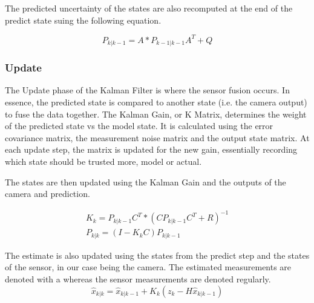 \documentclass[bare_jrnl_transmag]{subfiles}
\begin{document}
The predicted uncertainty of the states are also recomputed at the end of the predict state suing the following equation.

\begin{equation*}
    P_{k|k-1} = A * P_{k-1|k-1} A^T + Q
\end{equation*}


    
\subsubsection{Update}
The Update phase of the Kalman Filter is where the sensor fusion occurs. In essence, the predicted state is compared to another state (i.e. the camera output) to fuse the data together. 
The Kalman Gain, or K Matrix, determines the weight of the predicted state vs the model state. It is calculated using the error covariance matrix, the measurement noise matrix and the output state matrix. 
At each update step, the matrix is updated for the new gain, essentially recording which state should be trusted more, model or actual.

The states are then updated using the Kalman Gain and the outputs of the camera and prediction.

\begin{eqnarray*}
    K_k = P_{k|k-1} C^T * (C P_{k|k-1} C^T + R)^{-1} \\
    P_{k|k} = (I - K_k C) P_{k|k-1}
\end{eqnarray*}

The estimate is also updated using the states from the predict step and the states of the sensor, in our case being the camera. 
The estimated measurements are denoted with a \hat{} whereas the sensor measurements are denoted regularly. 
\begin{equation*}
    \hat{x}_{k|k} = \hat{x}_{k|k-1} + K_k (z_k - H \hat{x}_{k|k-1})
\end{equation*}
\end{document}

